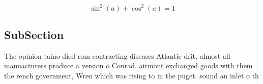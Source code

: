\documentclass[a4paper]{article}
\begin{document}
\[ \sin^2(a)+\cos^2(a) = 1 \]

\subsection{SubSection}

The opinion taino died rom contracting diseases Atlantic drit, almost all manuacturers produce a version o Conrad. airmont exchanged goods with them the rench government, Wren which was rising to in the puget. sound an inlet o th
\end{document}
